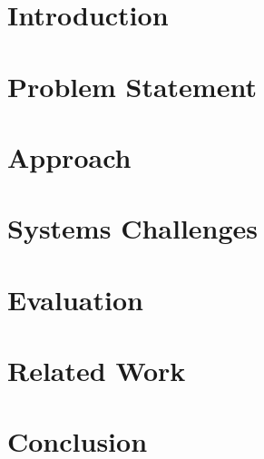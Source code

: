 \section{Introduction}
\label{dsec:intro}


\section{Problem Statement}
\label{dsec:problem_statement}


\section{Approach}
\label{dsec:approach}


\section{Systems Challenges}
\label{dsec:implementation}


\section{Evaluation}
\label{dsec:evaluation}


%

% 

\section{Related Work}
\label{dsec:related_work}


\section{Conclusion}
\label{dsec:conclusion}



